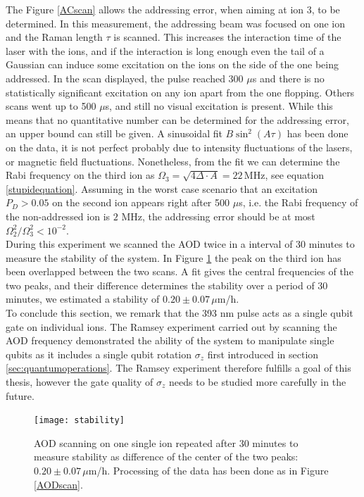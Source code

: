 The Figure \ref{ACscan} allows the addressing error, when aiming at ion 3, to be determined. In this measurement, the addressing beam was focused on one ion and the Raman length $\tau$ is scanned. This increases the interaction time of the laser with the ions, and if the interaction is long enough even the tail of a Gaussian can induce some excitation on the ions on the side of the one being addressed. In the scan displayed, the pulse reached 300 $\mu$s and there is no statistically significant excitation on any ion apart from the one flopping. Others scans went up to 500 $\mu$s, and still no visual excitation is present. While this means that no quantitative number can be determined for the addressing error, an upper bound can still be given. A sinusoidal fit $B\sin^2(A\tau)$ has been done on the data, it is not perfect probably due to intensity fluctuations of the lasers, or magnetic field fluctuations. Nonetheless, from the fit we can determine the Rabi frequency on the third ion as $\Omega_3 = \sqrt{4\Delta \cdot A} = 22\,\text{MHz}$, see equation \eqref{stupidequation}. Assuming in the worst case scenario that an excitation $P_D>0.05$ on the second ion appears right after 500 $\mu$s, i.e. the Rabi frequency of the non-addressed ion is $2$ MHz, the addressing error should be at most $\Omega_2^2/\Omega_3^2< 10^{-2}$.\\
During this experiment we scanned the AOD twice in a interval of 30 minutes to measure the stability of the system. In Figure \ref{fig:stability} the peak on the third ion has been overlapped between the two scans. A fit gives the central frequencies of the two peaks, and their difference determines the stability over a period of 30 minutes, we estimated a stability of $0.20\pm 0.07\,\mu$m/h.\\
To conclude this section, we remark that the 393 nm pulse acts as a single qubit gate on individual ions. The Ramsey experiment carried out by scanning the AOD frequency demonstrated the ability of the system to manipulate single qubits as it includes a single qubit rotation $\sigma_z$ first introduced in section \ref{sec:quantumoperations}. The Ramsey experiment therefore fulfills a goal of this thesis, however the gate quality of $\sigma_z$ needs to be studied more carefully in the future.
\begin{figure}
\centering
\texttt{[image: stability]}
\caption{AOD scanning on one single ion repeated after 30 minutes to measure stability as difference of the center of the two peaks: $0.20\pm 0.07\,\mu$m/h. Processing of the data has been done as in Figure \ref{AODscan}.}
\label{fig:stability}
\end{figure}
